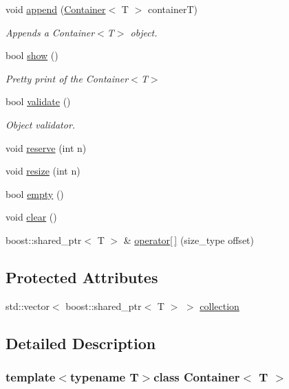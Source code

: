 \begin{DoxyCompactItemize}
void \hyperlink{class_container_a86d42cf807e073724bd2f8e08dcdfefa}{append} (\hyperlink{class_container}{Container}$<$ T $>$ containerT)
\begin{DoxyCompactList}\small\item\em Appends a Container$<$T$>$ object. \end{DoxyCompactList}\item 
bool \hyperlink{class_container_ad72379ee222b073a5eecec7fc1bedfc2}{show} ()
\begin{DoxyCompactList}\small\item\em Pretty print of the Container$<$T$>$ \end{DoxyCompactList}\item 
bool \hyperlink{class_container_aa99a036fd0fe6d6b82ba558157e557d3}{validate} ()
\begin{DoxyCompactList}\small\item\em Object validator. \end{DoxyCompactList}\item 
void \hyperlink{class_container_aa3cbae68ebeed649c52eb3805a30fb75}{reserve} (int n)
\item 
void \hyperlink{class_container_ab77ce6f8173bd47c4cf46643317dffdb}{resize} (int n)
\item 
bool \hyperlink{class_container_ab8e09c25f519687468ef5b9f0fae9b3e}{empty} ()
\item 
void \hyperlink{class_container_aab0690d44c8e04614cea46935ff49e7a}{clear} ()
\item 
boost::shared\_\-ptr$<$ T $>$ \& \hyperlink{class_container_aed3c227120a6a745fa9adfb25c3dd225}{operator\mbox{[}$\,$\mbox{]}} (size\_\-type offset)
\end{DoxyCompactItemize}
\subsection*{Protected Attributes}
\begin{DoxyCompactItemize}
\item 
std::vector$<$ boost::shared\_\-ptr$<$ T $>$ $>$ \hyperlink{class_container_a6cc12233bceb7d72709320d2c57e3398}{collection}
\end{DoxyCompactItemize}


\subsection{Detailed Description}
\subsubsection*{template$<$typename T$>$class Container$<$ T $>$}




